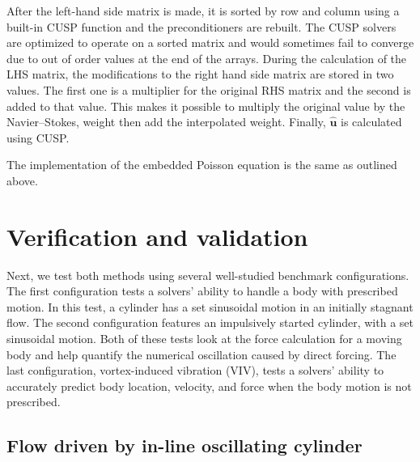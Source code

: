 \documentclass[preprint,12pt]{elsarticle}
\begin{document}
After the left-hand side matrix is made, it is sorted by row and column using a built-in CUSP function and the preconditioners are rebuilt.
The CUSP solvers are optimized to operate on a sorted matrix and would sometimes fail to converge due to out of order values at the end of the arrays.
During the calculation of the LHS matrix, the modifications to the right hand side matrix are stored in two values.
The first one is a multiplier for the original RHS matrix and the second is added to that value.
This makes it possible to multiply the original value by the Navier--Stokes, weight then add the interpolated weight.
Finally, $\hat{\textbf{u}}$ is calculated using CUSP.

The implementation of the embedded Poisson equation is the same as outlined above.


\section{Verification and validation}
\label{chapter:Validation}

Next, we test both methods using several well-studied benchmark configurations.
The first configuration tests a solvers' ability to handle a body with prescribed motion.
In this test, a cylinder has a set sinusoidal motion in an initially stagnant flow.
The second configuration features an impulsively started cylinder, with a set sinusoidal motion.
Both of these tests look at the force calculation for a moving body and help quantify the numerical oscillation caused by direct forcing.
The last configuration, vortex-induced vibration (VIV), tests a solvers' ability to accurately predict body location, velocity, and force when the body motion is not prescribed.

\subsection{Flow driven by in-line oscillating cylinder}
\label{sec:Oscillating Cylinder in no Flow}
\end{document}
